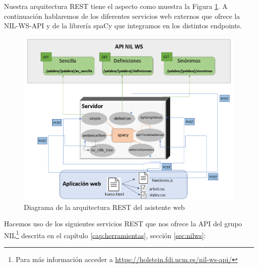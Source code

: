Nuestra arquitectura REST tiene el aspecto como muestra la Figura \ref{fig:ArquitecturaAsistenteR}. A continuación hablaremos de los diferentes servicios web externos que ofrece la NIL-WS-API y de la librería spaCy que integramos en los distintos endpoints.
\begin{figure}[h!]
	\centering
	
	
	\includegraphics[scale=0.9]{Imagenes/Figuras/ArquitecturaAsistenteR}
	
	
	\caption{Diagrama de la arquitectura REST del asistente web}
	\label{fig:ArquitecturaAsistenteR}
\end{figure}

  Hacemos uso de los siguientes servicios REST que nos ofrece la API del grupo NIL\footnote{Para más información acceder a \href{https://holstein.fdi.ucm.es/nil-ws-api/}{https://holstein.fdi.ucm.es/nil-ws-api/}} descrita en el capítulo \ref{cap:herramientas}, sección \ref{sec:nilws}:


	


